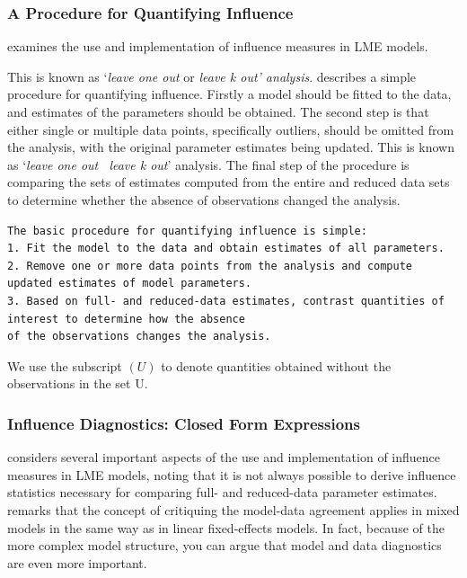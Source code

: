 \documentclass[12pt, a4paper]{report}
\theoremstyle{plain}
\theoremstyle{definition}
\theoremstyle{remark}
\begin{document}
	
	\subsubsection{A Procedure for Quantifying Influence}  %
\citet{schabenberger} examines the use and implementation of influence measures in LME models.

This is known as `\textit{leave one out} or \textit{leave k out' analysis}.
	\citet{schabenberger} describes a simple procedure for quantifying influence. Firstly a model should be fitted to the data, and
	estimates of the parameters should be obtained. The second step is that either single or multiple data points, specifically outliers,
	should be omitted from the analysis, with the original parameter estimates being updated. This is known as `\textit{leave one out \ leave k out}' analysis. The final step of the procedure is comparing the sets of estimates computed from the entire and reduced data sets to determine whether the absence of observations changed the
	analysis.

\begin{verbatim}
The basic procedure for quantifying influence is simple:
1. Fit the model to the data and obtain estimates of all parameters.
2. Remove one or more data points from the analysis and compute updated estimates of model parameters.
3. Based on full- and reduced-data estimates, contrast quantities of interest to determine how the absence
of the observations changes the analysis.
\end{verbatim}

We use the subscript $(U)$ to denote quantities obtained without the observations in the set U. 
	
\subsubsection{Influence Diagnostics: Closed Form Expressions} %
	
	\citet{schabenberger} considers several important aspects of the use and implementation of influence measures in LME models, noting that it is not always possible to
	derive influence statistics necessary for comparing full- and reduced-data parameter estimates. 
			\citet{schabenberger} remarks that the concept of critiquing the model-data agreement applies in mixed models in the same way as in linear
	fixed-effects models. In fact, because of the more complex model structure, you can argue that model and
	data diagnostics are even more important.
	
\end{document}
